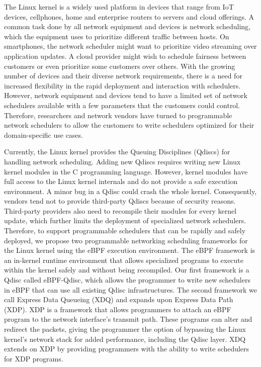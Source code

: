\documentclass[sigconf, nonacm]{acmart}
\begin{document}
The Linux kernel is a widely used platform in devices that range from IoT
devices, cellphones, home and enterprise routers to servers and cloud offerings.
A common task done by all network equipment and devices is network scheduling,
which the equipment uses to prioritize different traffic between hosts. On
smartphones, the network scheduler might want to prioritize video streaming over
application updates. A cloud provider might wish to schedule fairness between
customers or even prioritize some customers over others. With the growing number
of devices and their diverse network requirements, there is a need for increased
flexibility in the rapid deployment and interaction with schedulers. However,
network equipment and devices tend to have a limited set of network schedulers
available with a few parameters that the customers could control. Therefore,
researchers and network vendors have turned to programmable network schedulers
to allow the customers to write schedulers optimized for their domain-specific
use cases.

Currently, the Linux kernel provides the Queuing Disciplines (Qdiscs) for
handling network scheduling. Adding new Qdiscs requires writing new Linux kernel
modules in the C programming language. However, kernel modules have full access
to the Linux kernel internals and do not provide a safe execution environment. A
minor bug in a Qdisc could crash the whole kernel. Consequently, vendors tend
not to provide third-party Qdiscs because of security reasons. Third-party
providers also need to recompile their modules for every kernel update, which
further limits the deployment of specialized network schedulers. Therefore, to
support programmable schedulers that can be rapidly and safely deployed, we
propose two programmable networking scheduling frameworks for the Linux kernel
using the eBPF execution environment. The eBPF framework is an in-kernel runtime
environment that allows specialized programs to execute within the kernel safely
and without being recompiled. Our first framework is a Qdisc called eBPF-Qdisc,
which allows the programmer to write new schedulers in eBPF that can use all
existing Qdisc infrastructures. The second framework we call Express Data
Queueing (XDQ) and expands upon Express Data Path
(XDP)\cite{hoiland2018express}. XDP is a framework that allows programmers to
attach an eBPF program to the network interface's transmit path. These programs
can alter and redirect the packets, giving the programmer the option of
bypassing the Linux kernel's network stack for added performance, including the
Qdisc layer. XDQ extends on XDP by providing programmers with the ability to
write schedulers for XDP programs.
\end{document}
